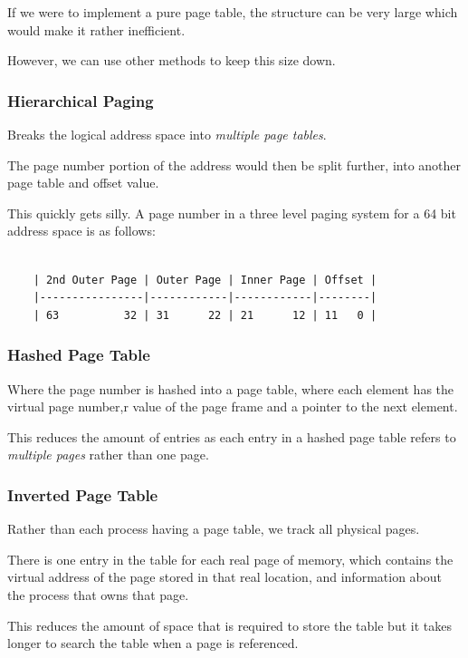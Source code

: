 \documentclass[a4]{article}
\begin{document}
If we were to implement a pure page table, the structure can be very large which would make it rather inefficient.

However, we can use other methods to keep this size down.

\subsubsection{Hierarchical Paging}

Breaks the logical address space into \textit{multiple page tables}.

The page number portion of the address would then be split further, into another page table and offset value.

This quickly gets silly. A page number in a three level paging system for a 64 bit address space is as follows:

\begin{verbatim}

    | 2nd Outer Page | Outer Page | Inner Page | Offset |
    |----------------|------------|------------|--------|
    | 63          32 | 31      22 | 21      12 | 11   0 |

\end{verbatim}

\subsubsection{Hashed Page Table}

Where the page number is hashed into a page table, where each element has the virtual page number,r value of the page frame and a pointer to the next element.

This reduces the amount of entries as each entry in a hashed page table refers to \textit{multiple pages} rather than one page.

\subsubsection{Inverted Page Table}

Rather than each process having a page table, we track all physical pages.

There is one entry in the table for each real page of memory, which contains the virtual address of the page stored in that real location, and information about the process that owns that page.

This reduces the amount of space that is required to store the table but it takes longer to search the table when a page is referenced.
\end{document}
